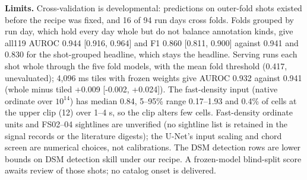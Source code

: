 \textbf{Limits.} Cross-validation is developmental: predictions on outer-fold shots existed before the recipe was fixed, and 16 of 94 run days cross folds. Folds grouped by run day, which hold every day whole but do not balance annotation kinds, give all119 AUROC 0.944 [0.916, 0.964] and F1 0.860 [0.811, 0.900] against 0.941 and 0.830 for the shot-grouped headline, which stays the headline. Serving runs each shot whole through the five fold models, with the mean fold threshold (0.417, unevaluated); 4,096 ms tiles with frozen weights give AUROC 0.932 against 0.941 (whole minus tiled +0.009 [-0.002, +0.024]). The fast-density input (native ordinate over $10^{14}$) has median 0.84, 5--95\% range 0.17--1.93 and 0.4\% of cells at the upper clip (12) over 1--4 s, so the clip alters few cells. Fast-density ordinate units and FS02--04 sightlines are unverified (no sightline list is retained in the signal records or the literature digests); the U-Net's input scaling and chord screen are numerical choices, not calibrations. The DSM detection rows are lower bounds on DSM detection skill under our recipe. A frozen-model blind-split score awaits review of those shots; no catalog onset is delivered.
